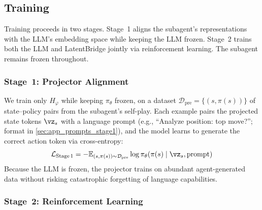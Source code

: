 \subsection{Training}
\label{sec:training}
Training proceeds in two stages. Stage~1 aligns the subagent's representations with the LLM's embedding space while keeping the LLM frozen. Stage~2 trains both the LLM and LatentBridge jointly via reinforcement learning. The subagent remains frozen throughout.

\subsubsection{Stage~1: Projector Alignment}
\label{sec:stage1}

We train only $H_\varphi$ while keeping $\pi_\theta$ frozen, on a dataset $\mathcal{D}_{\text{pre}} = \{(s, \pi(s))\}$ of state--policy pairs from the subagent's self-play. Each example pairs the projected state tokens $\vz_s$ with a language prompt (e.g., ``Analyze position: top move?''; format in \cref{sec:app_prompts_stage1}), and the model learns to generate the correct action token via cross-entropy:
%
\vspace{-2mm}
\[
\mathcal{L}_{\text{Stage\,1}} = -\mathbb{E}_{(s, \pi(s)) \sim \mathcal{D}_{\text{pre}}} \log \pi_\theta\!\left( \pi(s) \mid \vz_s, \text{prompt} \right)
\]
%
\vspace{-1mm}
Because the LLM is frozen, the projector trains on abundant agent-generated data without risking catastrophic forgetting of language capabilities.
\vspace{-2mm}
\subsubsection{Stage~2: Reinforcement Learning}
\label{sec:stage2}


